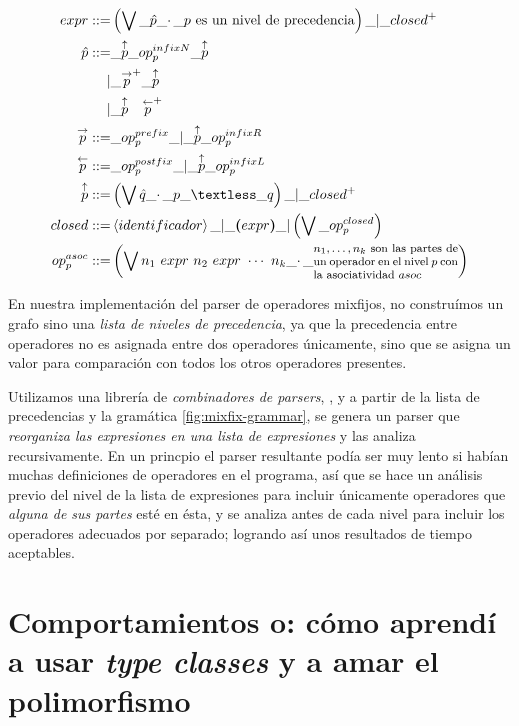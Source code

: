 {\begin{investigationfr}
{\begin{equation*}
\begin{split}
expr ::=& \left( \bigvee \_ \hat{p} \_ \cdotp \_
                 \text{$p$ es un nivel de precedencia} \right) \_
        | \_ closed^{+}
\\
\hat{p} ::=& \_ \overp{\uparrow} \_ op_p^{infixN} \_ \overp{\uparrow} \\
          |& \_ \overp{\rightarrow}^{+} \_ \overp{\uparrow} \\
          |& \_ \overp{\uparrow}\quad \overp{\leftarrow}^{+}
\\
\overp{\rightarrow} ::=& \_ op_p^{prefix} \_
                       | \_ \overp{\uparrow} \_ op_p^{infixR}
\\
\overp{\leftarrow} ::=& \_ op_p^{postfix} \_
                      | \_ \overp{\uparrow} \_ op_p^{infixL}
\\
\overp{\uparrow} ::=& \left( \bigvee \hat{q} \_ \cdotp \_
                             p \_ \textless \_ q \right) \_
                    | \_ closed^{+}
\\
closed ::=& \left<identificador\right> \_
          | \_ \boldsymbol{(} expr \boldsymbol{)} \_
          | \left( \bigvee \_ op_p^{closed} \right)
\\
op_p^{asoc} ::=& \left( \bigvee n_1\ expr\ n_2\ expr\ \cdots\ n_k \_ \cdotp \_
                        \parbox{0.3\textwidth}{\footnotesize$n_1,\ldots,n_k$ son las partes de un operador en el nivel $p$ con la asociatividad $asoc$} \right)
\end{split}
\end{equation*}
\label{fig:mixfix-grammar}
}
\end{investigationfr}

\begin{implementationfr}
En nuestra implementación del parser de operadores mixfijos, no construímos un grafo sino una \emph{lista de niveles de precedencia}, ya que la precedencia entre operadores no es asignada entre dos operadores únicamente, sino que se asigna un valor para comparación con todos los otros operadores presentes.

Utilizamos una librería de \emph{combinadores de parsers}, \cite{software:megaparsec}, y a partir de la lista de precedencias y la gramática \ref{fig:mixfix-grammar}, se genera un parser que \emph{reorganiza las expresiones en una lista de expresiones} y las analiza recursivamente. En un princpio el parser resultante podía ser muy lento si habían muchas definiciones de operadores en el programa, así que se hace un análisis previo del nivel de la lista de expresiones para incluir únicamente operadores que \emph{alguna de sus partes} esté en ésta, y se analiza antes de cada nivel para incluir los operadores adecuados por separado; logrando así unos resultados de tiempo aceptables.
\end{implementationfr}

\section{Comportamientos o: cómo aprendí a usar \emph{type classes} y a amar el polimorfismo}

}
